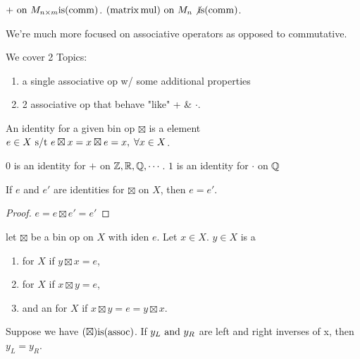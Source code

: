 \documentclass[12pt]{article}
\newcommand{\gop}[0]{\boxtimes}
\begin{document}
\bboxex
\(+\text{ on }M_{n\times m}\mathrm{is}(\mathrm{comm})\). \((\mathrm{matrix\,mul})\text{ on }M_n
\not\mathrm{is}(\mathrm{comm})\).
\ebox

We're much more focused on associative operators as opposed to commutative.

We cover 2 Topics:
\begin{enumerate}
  \item {} a single associative op w/ some additional properties
  \item {} 2 associative op that behave "like" + \& \(\cdot\).
\end{enumerate}


\bbox
\begin{defn}[Identity]\label{defn:iden}
  An identity for a given bin op \(\gop\) is a element \(e\in X\st e\gop
  x=x\gop e=x,\;\forall x\in X\).
\end{defn}
\ebox

\bboxex
\(0\) is an identity for \(+\) on \(\mathbb Z,\mathbb R,\mathbb Q,\cdots\).
\(1\) is an identity for \(\cdot\) on \(\mathbb Q\)
\ebox


\bbox
\begin{lem}\label{lem:uniq_of_iden}
  If \(e\) and \(e'\) are identities for \(\gop\) on \(X\), then \(e=e'\).
\end{lem}
\ebox

\bboxproof
\begin{proof}
    \(e=e\boxtimes e'=e'\)
\end{proof}
\ebox

\bbox
\begin{defn}[Inverse]\label{defn:inv}
  let \(\gop\) be a bin op on \(X\) with iden \(e\). Let \(x\in X\). 
  \(y\in X\) is a
  \begin{enumerate}
    \item {} for \(X\) if \(y\gop x=e\),
    \item {} for \(X\) if \(x\gop y=e\),
    \item and an  for \(X\) if \(x\gop y=e=y\gop x\).
  \end{enumerate}
\end{defn}
\ebox

\bbox
\begin{lem}\label{lem:assoc_then_uniq_inv}
  Suppose we have \((\gop)\is\TM{assoc}\). If \(y_L\text{ and }y_R\) are
  left and right inverses of x, then \(y_L=y_R\).
\end{lem}
\ebox
\end{document}
